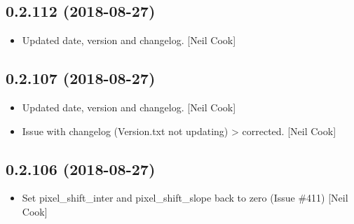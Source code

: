 \documentclass[a4paper,10pt,english]{report}
\begin{document}
\subsection{0.2.112 (2018-08-27)}
\label{\detokenize{misc/changelog:id349}}\begin{itemize}
\item {} 
Updated date, version and changelog. {[}Neil Cook{]}

\end{itemize}


\subsection{0.2.107 (2018-08-27)}
\label{\detokenize{misc/changelog:id350}}\begin{itemize}
\item {} 
Updated date, version and changelog. {[}Neil Cook{]}

\item {} 
Issue with changelog (Version.txt not updating) \textendash{}\textgreater{} corrected. {[}Neil
Cook{]}

\end{itemize}


\subsection{0.2.106 (2018-08-27)}
\label{\detokenize{misc/changelog:id351}}\begin{itemize}
\item {} 
Set pixel\_shift\_inter and pixel\_shift\_slope back to zero (Issue \#411)
{[}Neil Cook{]}

\end{itemize}
\end{document}
